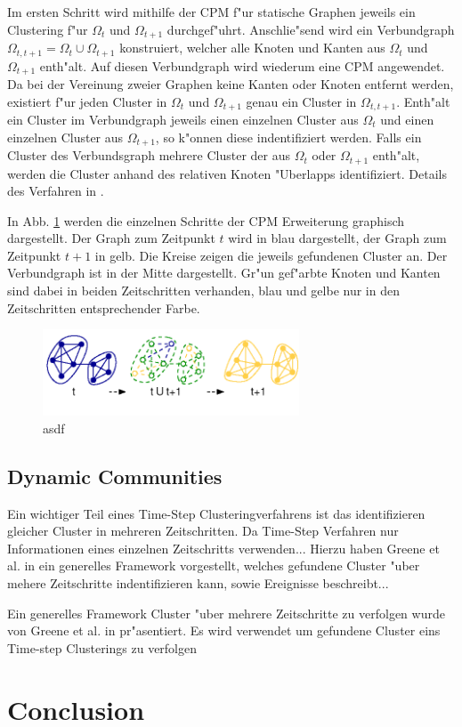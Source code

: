 \documentclass[journal]{vgtc}
\begin{document}
    Im ersten Schritt wird mithilfe der CPM f"ur statische Graphen jeweils ein Clustering f"ur $\Omega_{t}$ und $\Omega_{t+1}$ durchgef"uhrt.
    Anschlie"send wird ein Verbundgraph $\Omega_{t,t+1} = \Omega_{t} \cup \Omega_{t+1}$ konstruiert, welcher alle Knoten und Kanten aus
    $\Omega_t$ und $\Omega_{t+1}$ enth"alt. Auf diesen Verbundgraph wird wiederum eine CPM angewendet. Da bei der Vereinung zweier Graphen
    keine Kanten oder Knoten entfernt werden, existiert f"ur jeden Cluster in $\Omega_t$ und $\Omega_{t+1}$ genau ein Cluster in $\Omega_{t,t+1}$.
    Enth"alt ein Cluster im Verbundgraph jeweils einen einzelnen Cluster aus $\Omega_t$ und einen einzelnen Cluster aus $\Omega_{t+1}$,
    so k"onnen diese indentifiziert werden. Falls ein Cluster des Verbundsgraph mehrere Cluster der aus $\Omega_t$ oder $\Omega_{t+1}$
    enth"alt, werden die Cluster anhand des relativen Knoten "Uberlapps identifiziert. Details des Verfahren in \cite{CPM_time}.
    
    In Abb. \ref{fig:CPM_time} werden die einzelnen Schritte der CPM Erweiterung graphisch dargestellt. Der Graph zum Zeitpunkt $t$ wird
    in blau dargestellt, der Graph zum Zeitpunkt $t+1$ in gelb. Die Kreise zeigen die jeweils gefundenen Cluster an. Der Verbundgraph ist
    in der Mitte dargestellt. Gr"un gef"arbte Knoten und Kanten sind dabei in beiden Zeitschritten verhanden, blau und gelbe nur in den
    Zeitschritten entsprechender Farbe.
    
    \begin{figure}[h]
      \centering
      \includegraphics[width=3in]{images/CPM_time}
      \caption{\label{fig:CPM_time} asdf \cite{CPM_time}}
    \end{figure}

    
  \subsection{Dynamic Communities}
    Ein wichtiger Teil eines Time-Step Clusteringverfahrens ist das identifizieren gleicher Cluster in mehreren Zeitschritten. Da
    Time-Step Verfahren nur Informationen eines einzelnen Zeitschritts verwenden...
    Hierzu haben Greene et al. in \cite{timestep} ein generelles Framework vorgestellt, welches gefundene Cluster "uber mehere Zeitschritte
    indentifizieren kann, sowie Ereignisse beschreibt...
    
    Ein generelles Framework Cluster "uber mehrere Zeitschritte zu verfolgen wurde von Greene et al. in \cite{timestep} pr"asentiert.
    Es wird verwendet um gefundene Cluster eins Time-step Clusterings zu verfolgen
 
\section{Conclusion}



\end{document}
